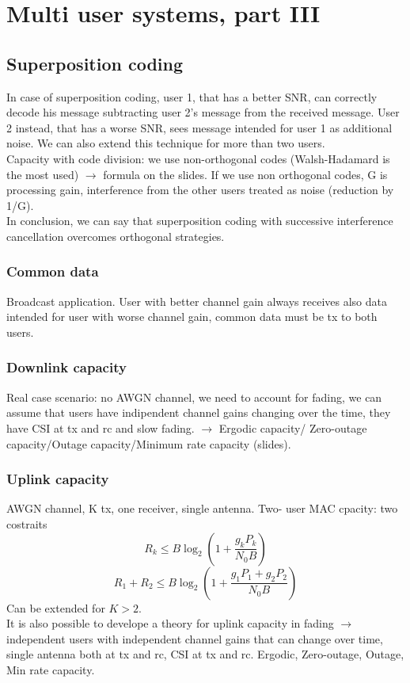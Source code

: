 \chapter{Multi user systems, part III}
\section{Superposition coding}
In case of superposition coding, user 1, that has a better SNR, can correctly decode his message subtracting user 2's message from the received message. User 2 instead, that has a worse SNR, sees message intended for user 1 as additional noise. We can also extend this technique for more than two users. \\
Capacity with code division: we use non-orthogonal codes (Walsh-Hadamard is the most used) $\rightarrow$ formula on the slides. If we use non orthogonal codes, G is processing gain, interference from the other users treated as noise (reduction by 1/G). \\
In conclusion, we can say that superposition coding with successive interference cancellation overcomes orthogonal strategies.
\subsection{Common data}
Broadcast application. User with better channel gain always receives also data intended for user with worse channel gain, common data must be tx to both users.\\
\subsection{Downlink capacity}
Real case scenario: no AWGN channel, we need to account for fading, we can assume that users have indipendent channel gains changing over the time, they have CSI at tx and rc and slow fading. $\rightarrow$ Ergodic capacity/ Zero-outage capacity/Outage capacity/Minimum rate capacity (slides).
\subsection{Uplink capacity}
AWGN channel, K tx, one receiver, single antenna. Two- user MAC cpacity: two costraits $$R_k \leq B\log_2(1+\frac{g_k P_k}{N_0 B})$$ $$R_1 +R_2 \leq B\log_2(1 + \frac{g_1P_1 + g_2P_2}{N_0 B})$$ Can be extended for $K > 2$.\\
It is also possible to develope a theory for uplink capacity in fading $\rightarrow$ independent users with independent channel gains that can change over time, single antenna both at tx and rc, CSI at tx and rc. Ergodic, Zero-outage, Outage, Min rate capacity.
